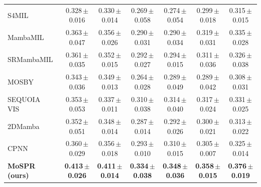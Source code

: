 \begin{tabular}{lcccccc}
S4MIL~\citep{fillioux2023s4mil} & 0.328\,{\tiny$\pm$}0.016 & 0.330\,{\tiny$\pm$}0.014 & 0.269\,{\tiny$\pm$}0.058 & 0.274\,{\tiny$\pm$}0.054 & 0.299\,{\tiny$\pm$}0.018 & 0.315\,{\tiny$\pm$}0.015\\
MambaMIL~\citep{yang2024mambamil} & 0.363\,{\tiny$\pm$}0.047 & 0.356\,{\tiny$\pm$}0.026 & 0.290\,{\tiny$\pm$}0.031 & 0.290\,{\tiny$\pm$}0.034 & 0.319\,{\tiny$\pm$}0.031 & 0.335\,{\tiny$\pm$}0.028\\
SRMambaMIL~\citep{yang2024mambamil} & 0.361\,{\tiny$\pm$}0.035 & 0.352\,{\tiny$\pm$}0.015 & 0.292\,{\tiny$\pm$}0.027 & 0.294\,{\tiny$\pm$}0.015 & 0.311\,{\tiny$\pm$}0.036 & 0.326\,{\tiny$\pm$}0.038\\
MOSBY~\citep{senbabaoglu2024mosby} & 0.343\,{\tiny$\pm$}0.036 & 0.349\,{\tiny$\pm$}0.013 & 0.264\,{\tiny$\pm$}0.028 & 0.289\,{\tiny$\pm$}0.049 & 0.289\,{\tiny$\pm$}0.042 & 0.308\,{\tiny$\pm$}0.031\\
SEQUOIA VIS~\citep{pizurica2024sequoia} & 0.353\,{\tiny$\pm$}0.053 & 0.337\,{\tiny$\pm$}0.011 & 0.310\,{\tiny$\pm$}0.038 & 0.314\,{\tiny$\pm$}0.040 & 0.317\,{\tiny$\pm$}0.024 & 0.331\,{\tiny$\pm$}0.025\\
2DMamba~\citep{zhang2025twodmamba} & 0.352\,{\tiny$\pm$}0.051 & 0.348\,{\tiny$\pm$}0.014 & 0.287\,{\tiny$\pm$}0.014 & 0.292\,{\tiny$\pm$}0.026 & 0.300\,{\tiny$\pm$}0.021 & 0.313\,{\tiny$\pm$}0.022\\
CPNN~\citep{nishimura2026cpnn} & 0.360\,{\tiny$\pm$}0.029 & 0.356\,{\tiny$\pm$}0.018 & 0.293\,{\tiny$\pm$}0.010 & 0.310\,{\tiny$\pm$}0.015 & 0.305\,{\tiny$\pm$}0.007 & 0.325\,{\tiny$\pm$}0.014\\
\midrule
\textbf{MoSPR (ours)} & \textbf{0.413\,{\tiny$\pm$}0.026} & \textbf{0.411\,{\tiny$\pm$}0.014} & \textbf{0.334\,{\tiny$\pm$}0.038} & \textbf{0.348\,{\tiny$\pm$}0.036} & \textbf{0.358\,{\tiny$\pm$}0.015} & \textbf{0.376\,{\tiny$\pm$}0.019}\\
\bottomrule
\end{tabular}